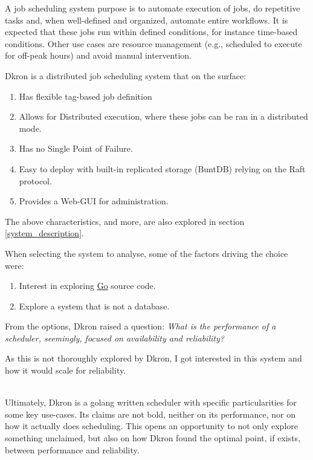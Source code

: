 \documentclass[runningheads]{llncs}
\begin{document}
A job scheduling system purpose is to automate execution of jobs, do repetitive tasks
and, when well-defined and organized, automate entire workflows. It is expected that these jobs run within defined conditions,
for instance time-based conditions. Other use cases are resource management
(e.g., scheduled to execute for off-peak hours) and avoid manual intervention.

Dkron is a distributed job scheduling system that on the surface:

\begin{enumerate}
    \item Has flexible tag-based job definition
    \item Allows for Distributed execution, where these jobs can be ran in a distributed mode. %
    \item Has no Single Point of Failure.
    \item Easy to deploy with built-in replicated storage (BuntDB) relying on the Raft protocol.
    \item Provides a Web-GUI for administration.
\end{enumerate}
The above characteristics, and more, are also explored in section \ref{system_description}.

When selecting the system to analyse, some of the factors driving the choice were:
\begin{enumerate}
    \item Interest in exploring \href{https://go.dev/}{Go} source code.
    \item Explore a system that is not a database.
\end{enumerate}
From the options, Dkron raised a question:
\textit{What is the performance of a scheduler, seemingly, focused on availability and reliability?}

As this is not thoroughly explored by Dkron, I got interested in this system and how it would scale
for reliability.

~\\
Ultimately, Dkron is a golang written scheduler with specific particularities for some key use-cases.
Its claims are not bold, neither on its performance, nor on how it actually does scheduling. This opens an
opportunity to not only explore something unclaimed, but also on how Dkron found the
optimal point, if exists, between performance and reliability.

\begin{figure}[h]
\centering
\end{figure}
\end{document}
